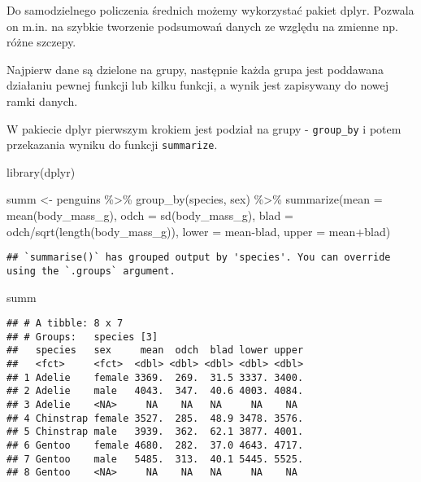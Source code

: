 \documentclass[
]{book}
\newenvironment{Shaded}{\begin{snugshade}}{\end{snugshade}}
\newcommand{\AttributeTok}[1]{\textcolor[rgb]{0.77,0.63,0.00}{#1}}
\newcommand{\FunctionTok}[1]{\textcolor[rgb]{0.00,0.00,0.00}{#1}}
\newcommand{\NormalTok}[1]{#1}
\newcommand{\OtherTok}[1]{\textcolor[rgb]{0.56,0.35,0.01}{#1}}
\newcommand{\SpecialCharTok}[1]{\textcolor[rgb]{0.00,0.00,0.00}{#1}}
\begin{document}
Do samodzielnego policzenia średnich możemy wykorzystać pakiet dplyr. Pozwala on m.in. na szybkie tworzenie podsumowań danych ze względu na zmienne np. różne szczepy.

Najpierw dane są dzielone na grupy, następnie każda grupa jest poddawana działaniu pewnej funkcji lub kilku funkcji, a wynik jest zapisywany do nowej ramki danych.

W pakiecie dplyr pierwszym krokiem jest podział na grupy - \texttt{group\_by} i potem przekazania wyniku do funkcji \texttt{summarize}.

\begin{Shaded}
\begin{Highlighting}[]
\FunctionTok{library}\NormalTok{(dplyr)}

\NormalTok{summ }\OtherTok{\textless{}{-}}\NormalTok{ penguins }\SpecialCharTok{\%\textgreater{}\%} \FunctionTok{group\_by}\NormalTok{(species, sex) }\SpecialCharTok{\%\textgreater{}\%} 
  \FunctionTok{summarize}\NormalTok{(}\AttributeTok{mean =} \FunctionTok{mean}\NormalTok{(body\_mass\_g), }\AttributeTok{odch =} \FunctionTok{sd}\NormalTok{(body\_mass\_g), }
            \AttributeTok{blad =}\NormalTok{ odch}\SpecialCharTok{/}\FunctionTok{sqrt}\NormalTok{(}\FunctionTok{length}\NormalTok{(body\_mass\_g)),}
            \AttributeTok{lower =}\NormalTok{ mean}\SpecialCharTok{{-}}\NormalTok{blad, }
            \AttributeTok{upper =}\NormalTok{ mean}\SpecialCharTok{+}\NormalTok{blad)}
\end{Highlighting}
\end{Shaded}

\begin{verbatim}
## `summarise()` has grouped output by 'species'. You can override using the `.groups` argument.
\end{verbatim}

\begin{Shaded}
\begin{Highlighting}[]
\NormalTok{summ}
\end{Highlighting}
\end{Shaded}

\begin{verbatim}
## # A tibble: 8 x 7
## # Groups:   species [3]
##   species   sex     mean  odch  blad lower upper
##   <fct>     <fct>  <dbl> <dbl> <dbl> <dbl> <dbl>
## 1 Adelie    female 3369.  269.  31.5 3337. 3400.
## 2 Adelie    male   4043.  347.  40.6 4003. 4084.
## 3 Adelie    <NA>     NA    NA   NA     NA    NA 
## 4 Chinstrap female 3527.  285.  48.9 3478. 3576.
## 5 Chinstrap male   3939.  362.  62.1 3877. 4001.
## 6 Gentoo    female 4680.  282.  37.0 4643. 4717.
## 7 Gentoo    male   5485.  313.  40.1 5445. 5525.
## 8 Gentoo    <NA>     NA    NA   NA     NA    NA
\end{verbatim}
\end{document}
